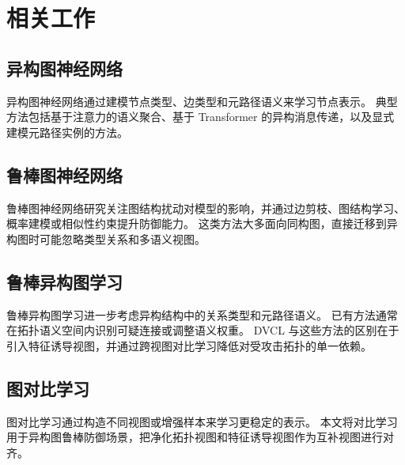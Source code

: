 \section{相关工作}
\label{sec:related-work-zh}

\subsection{异构图神经网络}

异构图神经网络通过建模节点类型、边类型和元路径语义来学习节点表示。
典型方法包括基于注意力的语义聚合、基于 Transformer 的异构消息传递，以及显式建模元路径实例的方法。

\subsection{鲁棒图神经网络}

鲁棒图神经网络研究关注图结构扰动对模型的影响，并通过边剪枝、图结构学习、概率建模或相似性约束提升防御能力。
这类方法大多面向同构图，直接迁移到异构图时可能忽略类型关系和多语义视图。

\subsection{鲁棒异构图学习}

鲁棒异构图学习进一步考虑异构结构中的关系类型和元路径语义。
已有方法通常在拓扑语义空间内识别可疑连接或调整语义权重。
DVCL 与这些方法的区别在于引入特征诱导视图，并通过跨视图对比学习降低对受攻击拓扑的单一依赖。

\subsection{图对比学习}

图对比学习通过构造不同视图或增强样本来学习更稳定的表示。
本文将对比学习用于异构图鲁棒防御场景，把净化拓扑视图和特征诱导视图作为互补视图进行对齐。
